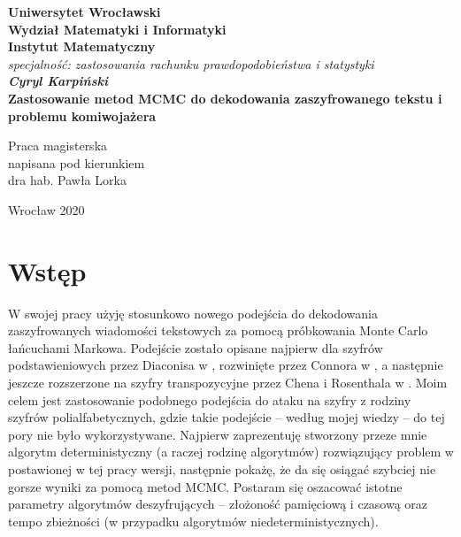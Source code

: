 \documentclass[a4paper]{article}
\theoremstyle{defn}
\theoremstyle{theorem}
\theoremstyle{lemma}
\theoremstyle{cor}
\theoremstyle{fact}
\begin{document}
\lstset{language=Python}

\newpage
\thispagestyle{empty}
\begin{center}
\textbf{\large Uniwersytet Wrocławski\\
Wydział Matematyki i Informatyki\\
Instytut Matematyczny}\\
\textit{\large specjalność: zastosowania rachunku prawdopodobieństwa i statystyki}\\
\vspace{4cm}
\textbf{\textit{\large Cyryl Karpiński}\\
\vspace{0.5cm}
{\Large Zastosowanie metod MCMC do dekodowania zaszyfrowanego tekstu
i problemu komiwojażera}}\\
\end{center}
\vspace{3cm}
{\large \hspace*{6.5cm}Praca magisterska\\
\hspace*{6.5cm}napisana pod kierunkiem\\
\hspace*{6.5cm}dra hab. Pawła Lorka}\\
\vfill
\begin{center}
{\large Wrocław 2020}\\
\end{center}

\newpage
\tableofcontents
\newpage
\section{Wstęp}
W swojej pracy użyję stosunkowo nowego podejścia do dekodowania zaszyfrowanych wiadomości tekstowych za pomocą próbkowania Monte Carlo łańcuchami Markowa. Podejście zostało opisane najpierw dla szyfrów podstawieniowych przez Diaconisa w \cite{Diaconis}, rozwinięte przez Connora w \cite{Connor}, a następnie jeszcze rozszerzone na szyfry transpozycyjne przez Chena i Rosenthala w \cite{Chen&Rosenthal}. Moim celem jest zastosowanie podobnego podejścia do ataku na szyfry z rodziny szyfrów polialfabetycznych, gdzie takie podejście – według mojej wiedzy – do tej pory nie było wykorzystywane. Najpierw zaprezentuję stworzony przeze mnie algorytm deterministyczny (a raczej rodzinę algorytmów) rozwiązujący problem w postawionej w tej pracy wersji, następnie pokażę, że da się osiągać szybciej nie gorsze wyniki za pomocą metod MCMC. Postaram się oszacować istotne parametry algorytmów deszyfrujących – złożoność pamięciową i czasową oraz tempo zbieżności (w przypadku algorytmów niedeterministycznych).
\end{document}
